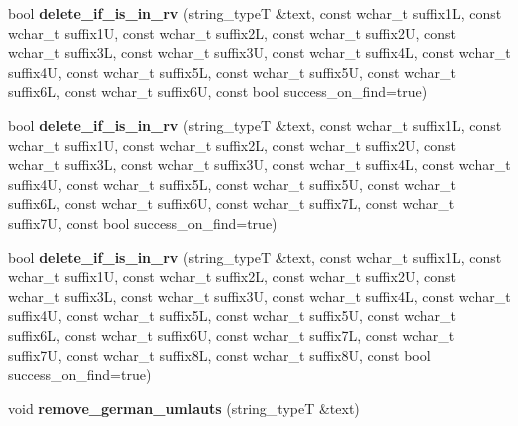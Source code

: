 \begin{DoxyCompactItemize}
\item 
\hypertarget{group___stemming_ga2102feb734da90e80172d1f34102c8cd}{bool {\bfseries delete\-\_\-if\-\_\-is\-\_\-in\-\_\-rv} (string\-\_\-type\-T \&text, const wchar\-\_\-t suffix1\-L, const wchar\-\_\-t suffix1\-U, const wchar\-\_\-t suffix2\-L, const wchar\-\_\-t suffix2\-U, const wchar\-\_\-t suffix3\-L, const wchar\-\_\-t suffix3\-U, const wchar\-\_\-t suffix4\-L, const wchar\-\_\-t suffix4\-U, const wchar\-\_\-t suffix5\-L, const wchar\-\_\-t suffix5\-U, const wchar\-\_\-t suffix6\-L, const wchar\-\_\-t suffix6\-U, const bool success\-\_\-on\-\_\-find=true)}\label{group___stemming_ga2102feb734da90e80172d1f34102c8cd}

\item 
\hypertarget{group___stemming_gacc427221d55bf93e113f2811eedca74a}{bool {\bfseries delete\-\_\-if\-\_\-is\-\_\-in\-\_\-rv} (string\-\_\-type\-T \&text, const wchar\-\_\-t suffix1\-L, const wchar\-\_\-t suffix1\-U, const wchar\-\_\-t suffix2\-L, const wchar\-\_\-t suffix2\-U, const wchar\-\_\-t suffix3\-L, const wchar\-\_\-t suffix3\-U, const wchar\-\_\-t suffix4\-L, const wchar\-\_\-t suffix4\-U, const wchar\-\_\-t suffix5\-L, const wchar\-\_\-t suffix5\-U, const wchar\-\_\-t suffix6\-L, const wchar\-\_\-t suffix6\-U, const wchar\-\_\-t suffix7\-L, const wchar\-\_\-t suffix7\-U, const bool success\-\_\-on\-\_\-find=true)}\label{group___stemming_gacc427221d55bf93e113f2811eedca74a}

\item 
\hypertarget{group___stemming_gab0b50197480905de68f3be29714860d7}{bool {\bfseries delete\-\_\-if\-\_\-is\-\_\-in\-\_\-rv} (string\-\_\-type\-T \&text, const wchar\-\_\-t suffix1\-L, const wchar\-\_\-t suffix1\-U, const wchar\-\_\-t suffix2\-L, const wchar\-\_\-t suffix2\-U, const wchar\-\_\-t suffix3\-L, const wchar\-\_\-t suffix3\-U, const wchar\-\_\-t suffix4\-L, const wchar\-\_\-t suffix4\-U, const wchar\-\_\-t suffix5\-L, const wchar\-\_\-t suffix5\-U, const wchar\-\_\-t suffix6\-L, const wchar\-\_\-t suffix6\-U, const wchar\-\_\-t suffix7\-L, const wchar\-\_\-t suffix7\-U, const wchar\-\_\-t suffix8\-L, const wchar\-\_\-t suffix8\-U, const bool success\-\_\-on\-\_\-find=true)}\label{group___stemming_gab0b50197480905de68f3be29714860d7}

\item 
\hypertarget{group___stemming_ga760765796790f28c1acfa3b1e603781d}{void {\bfseries remove\-\_\-german\-\_\-umlauts} (string\-\_\-type\-T \&text)}\label{group___stemming_ga760765796790f28c1acfa3b1e603781d}


\end{DoxyCompactItemize}
